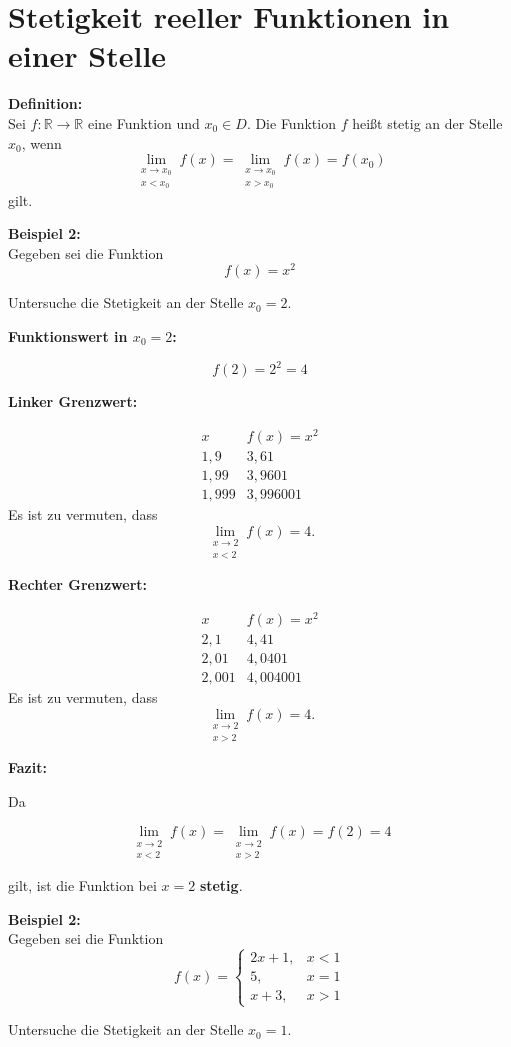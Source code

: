 \documentclass[12pt]{article}
\newcommand{\limeslinks}[2]{%
  \lim_{\substack{#1 \to #2 \\ #1 < #2}}%
}
\newcommand{\limesrechts}[2]{%
  \lim_{\substack{#1 \to #2 \\ #1 > #2}}%
}
\begin{document}
\section*{Stetigkeit reeller Funktionen in einer Stelle}

\begin{tcolorbox}[colback=myblue]
\textbf{Definition:}\\
Sei $f\colon \mathbb{R} \to \mathbb{R}$ eine Funktion und $x_0 \in D$. 
Die Funktion $f$ heißt stetig an der Stelle $x_0$, wenn
$$\limeslinks{x}{x_0}f(x)=\limesrechts{x}{x_0}f(x)=f(x_0)$$
gilt.
\end{tcolorbox}

\begin{tcolorbox}[colback=mygreen]
\textbf{Beispiel 2:}\\
Gegeben sei die Funktion
\[
f(x)=x^2
\]

Untersuche die Stetigkeit an der Stelle $x_0=2$.
\end{tcolorbox}

\textbf{Funktionswert in $x_0=2$:}

$$f(2)=2^2=4$$

\textbf{Linker Grenzwert:}

\[
\begin{array}{c|c}
x & f(x)=x^2 \\
\hline
1{,}9 & 3{,}61 \\
1{,}99 & 3{,}9601 \\
1{,}999 & 3{,}996001
\end{array}
\]
Es ist zu vermuten, dass
\[
\limeslinks{x}{2} f(x)=4.
\]

\textbf{Rechter Grenzwert:}

\[
\begin{array}{c|c}
x & f(x)=x^2 \\
\hline
2{,}1 & 4{,}41 \\
2{,}01 & 4{,}0401 \\
2{,}001 & 4{,}004001
\end{array}
\]
Es ist zu vermuten, dass
\[
\limesrechts{x}{2} f(x)=4.
\]


\textbf{Fazit:}

Da

\[
\limeslinks{x}{2}f(x)=\limesrechts{x}{2}f(x)=f(2)=4
\]

gilt, ist die Funktion bei $x=2$ \textbf{stetig}.

\newpage
\begin{tcolorbox}[colback=mygreen]
\textbf{Beispiel 2:}\\
Gegeben sei die Funktion
\[
f(x)=
\begin{cases}
2x+1, & x<1 \\
5, & x=1 \\
x+3, & x>1
\end{cases}
\]

Untersuche die Stetigkeit an der Stelle $x_0=1$.
\end{tcolorbox}
\end{document}
